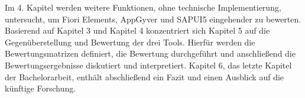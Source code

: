Im 4. Kapitel werden weitere Funktionen, ohne technische Implementierung, untersucht, um Fiori Elements, AppGyver und SAPUI5 eingehender zu bewerten. Basierend auf Kapitel 3 und Kapitel 4 konzentriert sich Kapitel 5 auf die Gegenüberstellung und Bewertung der drei Tools. Hierfür werden die Bewertungsmatrizen definiert, die Bewertung durchgeführt und anschließend die Bewertungsergebnisse diskutiert und interpretiert. Kapitel 6, das letzte Kapitel der Bachelorarbeit, enthält abschließend ein Fazit und einen Ausblick auf die künftige Forschung.
